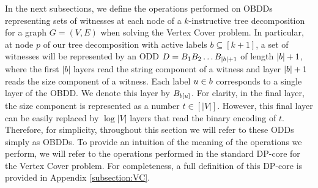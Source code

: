 In the next subsections, we define the operations performed on OBDDs representing sets of witnesses at each node of a $k$-instructive tree decomposition for a graph $G = (V,E)$ when solving the {\sc Vertex Cover} problem.
In particular, at node $p$ of our tree decomposition with active labels $b\subseteq [k+1]$, a set of witnesses will be represented by an ODD $D = B_1B_2\ldots B_{|b|+1}$ of length $|b|+1$, where the first $|b|$ layers read the string component of a witness and layer $|b|+1$ reads the size component of a witness. Each label $u\in b$ corresponds to a single layer of the OBDD. We denote this layer by $B_{b[u]}$. For clarity, in the final layer, the size component is represented as a number $t\in [|V|]$. However, this final layer can be easily replaced by $\log |V|$ layers that read the binary encoding of $t$. Therefore, for simplicity, throughout this section we will refer to these ODDs simply as OBDDs. 
To provide an intuition of the meaning of the operations we perform, we will refer to the operations performed in the standard DP-core for the {\sc Vertex Cover} problem. For completeness, a full definition of this DP-core is provided in Appendix \ref{subsection:VC}.

